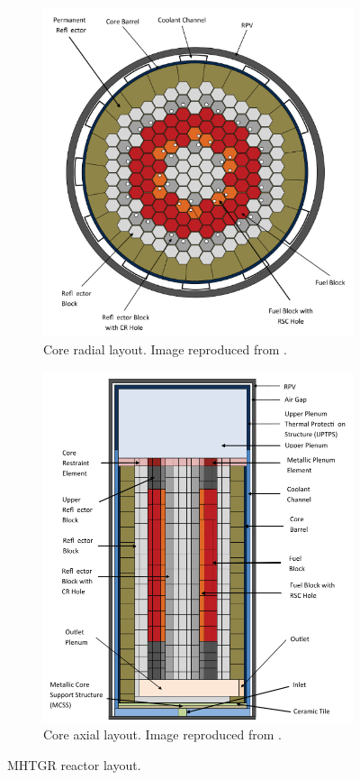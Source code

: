 \documentclass[11pt,letterpaper]{article}
\begin{document}
\begin{figure}[htbp!]
	\centering
	\begin{subfigure}[t]{0.4\textwidth}
		\centering
		\includegraphics[width=0.95\linewidth]{figures/radial-layout.png}
		\caption{Core radial layout. Image reproduced from \cite{oecd_nea_benchmark_2017}.}
	\end{subfigure}
	\begin{subfigure}[t]{0.4\textwidth}
		\centering
		\includegraphics[width=0.95\linewidth]{figures/axial-layout.png}
		\caption{Core axial layout. Image reproduced from \cite{oecd_nea_benchmark_2017}.}
		\label{fig:layoutb}
	\end{subfigure}
	\hfill
	\caption{MHTGR reactor layout.}
	\label{fig:layout}
\end{figure}
\end{document}
